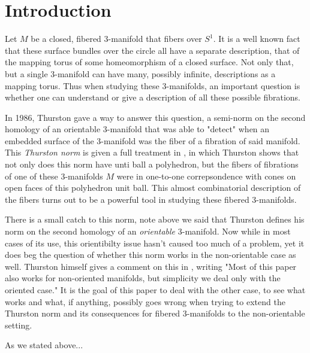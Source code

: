 \section{Introduction}

Let $M$ be a closed, fibered 3-manifold that fibers over $S^1$. It is a well known fact that these surface bundles over the circle all have a separate description, that of the mapping torus of some homeomorphism of a closed surface. Not only that, but a single 3-manifold can have many, possibly infinite, descriptions as a mapping torus. Thus when studying these 3-manifolds, an important question is whether one can understand or give a description of all these possible fibrations. 

In 1986, Thurston gave a way to answer this question, a semi-norm on the second homology of an orientable 3-manifold that was able to "detect" when an embedded surface of the 3-manifold was the fiber of a fibration of said manifold. This \textit{Thurston norm} is given a full treatment in \cite{thurston1986norm}, in which Thurston shows that not only does this norm have unti ball a polyhedron, but the fibers of fibrations of one of these 3-manifolds $M$ were in one-to-one correpsondence with cones on open faces of this polyhedron unit ball. This almost combinatorial description of the fibers turns out to be a powerful tool in studying these fibered 3-manifolds.

There is a small catch to this norm, note above we said that Thurston defines his norm on the second homology of an \textit{orientable} 3-manifold. Now while in most cases of its use, this orientibilty issue hasn't caused too much of a problem, yet it does beg the question of whether this norm works in the non-orientable case as well. Thurston himself gives a comment on this in \cite{thurston1986norm}, writing "Most of this paper also works for non-oriented manifolds, but simplicity we deal only with the oriented case." It is the goal of this paper to deal with the other case, to see what works and what, if anything, possibly goes wrong when trying to extend the Thurston norm and its consequences for fibered 3-manifolds to the non-orientable setting. 

As we stated above...